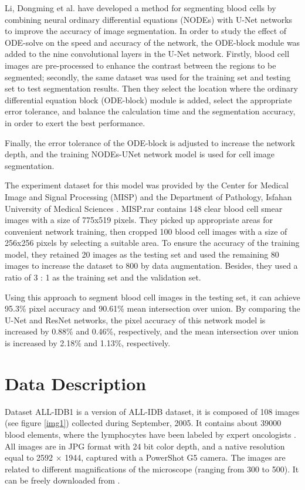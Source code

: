 \documentclass[conference]{IEEEtran}
\begin{document}
Li, Dongming et al. \cite{li2021robust} have developed a method for segmenting blood cells by combining neural ordinary differential equations (NODEs) with U-Net networks to improve the accuracy of image segmentation. In order to study the effect of ODE-solve on the speed and accuracy of the network, the ODE-block module was added to the nine convolutional layers in the U-Net network. Firstly, blood cell images are pre-processed to enhance the contrast between the regions to be segmented; secondly, the same dataset was used for the training set and testing set to test segmentation results. Then they select the location where the ordinary differential equation block (ODE-block) module is added, select the appropriate error tolerance, and balance the calculation time and the segmentation accuracy, in order to exert the best performance.\

Finally, the error tolerance of the ODE-block is adjusted to increase the network depth, and the training NODEs-UNet network model is used for cell image segmentation. 

The experiment dataset for this model was provided by the Center for Medical Image and Signal Processing (MISP) and the Department of Pathology, Isfahan University of Medical Sciences \cite{sarrafzadeh2014selection}. MISP.rar contains 148 clear blood cell smear images with a size of 775x519 pixels. They picked up appropriate areas for convenient network training, then cropped 100 blood cell images with a size of 256x256 pixels by selecting a suitable area. To ensure the accuracy of the training model, they retained 20 images as the testing set and used the remaining 80 images to increase the dataset to 800 by data augmentation. Besides, they used a ratio of 3 : 1 as the training set and the validation set.

Using this approach to segment blood cell images in the testing set, it can achieve 95.3\% pixel accuracy and 90.61\% mean intersection over union. By comparing the U-Net and ResNet networks, the pixel accuracy of this network model is increased by 0.88\% and 0.46\%, respectively, and the mean intersection over union is increased by 2.18\% and 1.13\%, respectively.

\section{Data Description}
Dataset ALL-IDB1 is a version of ALL-IDB dataset, it is composed of 108 images (see figure \ref{img1}) collected during September, 2005. It contains about 39000 blood elements, where the lymphocytes have been labeled by expert oncologists \cite{labati2011all}. All images are in JPG format with 24 bit color depth, and a native resolution equal to 2592 × 1944, captured with a PowerShot G5 camera. The images are related to different magnifications of the microscope (ranging from 300 to 500). It can be freely downloaded from \cite{ALL_IDB_L}.
\end{document}
